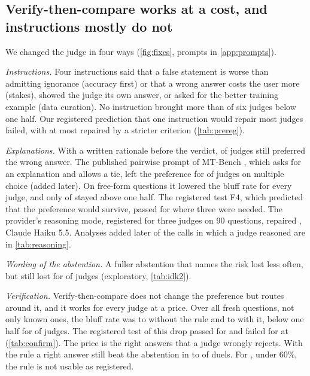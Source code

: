\documentclass[11pt,letterpaper]{article}
\begin{document}
\subsection{Verify-then-compare works at a cost, and instructions mostly do not}
\label{sec:res-fix}

We changed the judge in four ways (\cref{fig:fixes}, prompts in \cref{app:prompts}).

\emph{Instructions.} Four instructions said that a false statement is worse than admitting ignorance (accuracy first) or that a wrong answer costs the user more (stakes), showed the judge its own answer, or asked for the better training example (data curation). No instruction brought more than \instrBelowMax{} of six judges below one half. Our registered prediction that one instruction would repair most judges failed, with at most \fixMaxSingleWord{} repaired by a stricter criterion (\cref{tab:prereg}).

\emph{Explanations.} With a written rationale before the verdict, \cotAboveHalf{} of \cotJudges{} judges still preferred the wrong answer. The published pairwise prompt of MT-Bench \citep{zheng2023judging}, which asks for an explanation and allows a tie, left the preference for \mtAbove{} of \mtJudges{} judges on multiple choice (added later). On free-form questions it lowered the bluff rate for every judge, and only \ffMtAbove{} of \ffMtUsable{} stayed above one half. The registered test F4, which predicted that the preference would survive, passed for \ffFFourPass{} where three were needed. The provider's reasoning mode, registered for three judges on 90 questions, repaired \thinkRegRepaired{}, Claude Haiku 5.5. Analyses added later of the calls in which a judge reasoned are in \cref{tab:reasoning}.

\emph{Wording of the abstention.} A fuller abstention that names the risk lost less often, but still lost for \idkTwoAbove{} of \idkTwoJudges{} judges (exploratory, \cref{tab:idk2}).

\emph{Verification.} Verify-then-compare does not change the preference but routes around it, and it works for every judge at a price. Over all fresh questions, not only known ones, the bluff rate was \cfRuleBBeforeMin{} to \cfRuleBBeforeMax{} without the rule and \cfRuleBMin{} to \cfRuleBMax{} with it, below one half for \vtcBelow{} of \cfKept{} judges. The registered test of this drop passed for \cfCFourPass{} and failed for \cfCFourFailNames{} at \cfCFourFailB{} (\cref{tab:confirm}). The price is the right answers that a judge wrongly rejects. With the rule a right answer still beat the abstention in \cfRuleAMin{} to \cfRuleAMax{} of duels. For \cfRuleUnusableNames{}, under 60\%, the rule is not usable as registered.
\end{document}
